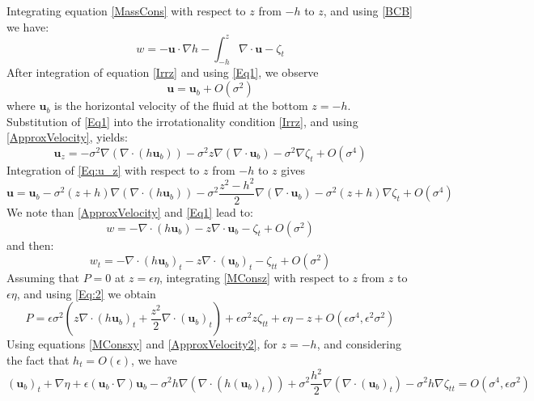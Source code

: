 \documentclass[11pt,a4paper]{article}
\begin{document}
	Integrating equation \eqref{MassCons} with respect to $z$ from $-h$ to $z$, and using \eqref{BCB} we have: 
	\begin{equation}
		w = -\mathbf{u} \cdot \nabla h - \int^z_{-h} \nabla \cdot \mathbf{u} - \zeta_t 
		\label{Eq1}
	\end{equation}
	After integration of equation \eqref{Irrz} and using \eqref{Eq1}, we observe 
	\begin{equation}
		\mathbf{u} = \mathbf{u}_b + O(\sigma^2) \label{ApproxVelocity}
	\end{equation}
	where $\mathbf{u}_b$ is the horizontal velocity of the fluid at the bottom $z=-h$. Substitution of \eqref{Eq1} into the irrotationality condition \eqref{Irrz}, and using \eqref{ApproxVelocity}, yields:
	\begin{equation}
		\mathbf{u}_z = -\sigma^2\nabla(\nabla \cdot (h \mathbf{u}_b)) - \sigma^2 z \nabla(\nabla \cdot \mathbf{u}_b) - \sigma^2 \nabla \zeta_t + O(\sigma^4) 
		\label{Eq:u_z}
	\end{equation}
	Integration of \eqref{Eq:u_z} with respect to $z$ from $-h$ to $z$ gives
	\begin{equation}
		\mathbf{u} = \mathbf{u}_b - \sigma^2(z+h)\nabla (\nabla \cdot (h \mathbf{u}_b)) - \sigma^2 \frac{z^2-h^2}{2}\nabla ( \nabla \cdot \mathbf{u}_b) - \sigma^2(z+h)\nabla \zeta_t + O(\sigma^4) \label{ApproxVelocity2}
	\end{equation}
	We note than \eqref{ApproxVelocity} and \eqref{Eq1} lead to: 
	\begin{equation}
		w = - \nabla \cdot (h \mathbf{u}_b) - z \nabla \cdot \mathbf{u}_b - \zeta_t + O(\sigma^2)
	\end{equation}
	and then:
	\begin{equation}
		w_t = - \nabla \cdot (h \mathbf{u}_b)_t - z \nabla \cdot (\mathbf{u}_b)_t - \zeta_{tt} + O(\sigma^2) \label{Eq:2} 
	\end{equation}
	Assuming that $P = 0$ at $z = \epsilon\eta$, integrating \eqref{MConsz} with respect to $z$ from $z$ to $\epsilon\eta$, and using \eqref{Eq:2} we obtain
	\begin{equation}
		P = \epsilon \sigma^2(z\nabla \cdot (h \mathbf{u}_b)_t + \frac{z^2}{2} \nabla \cdot (\mathbf{u}_b)_t) + \epsilon \sigma^2z \zeta_{tt} + \epsilon \eta - z + O(\epsilon\sigma^4, \epsilon^2 \sigma^2) \label{Pressure}
	\end{equation}
	Using equations \eqref{MConsxy} and \eqref{ApproxVelocity2}, for $z = -h$, and considering the fact that $h_t = O(\epsilon)$, we have
	\begin{equation}
		(\mathbf{u}_b)_t + \nabla \eta + \epsilon (\mathbf{u}_b \cdot \nabla)\mathbf{u}_b - \sigma^2 h \nabla (\nabla \cdot (h (\mathbf{u}_b)_t)) + \sigma^2 \frac{h^2}{2} \nabla (\nabla \cdot (\mathbf{u}_b)_t) - \sigma^2 h \nabla \zeta_{tt} = O(\sigma^4, \epsilon \sigma ^2) \label{Eq:3}
	\end{equation}
\end{document}
